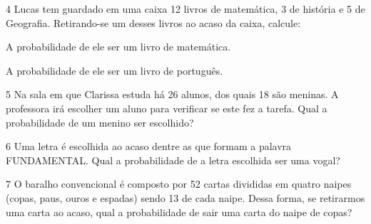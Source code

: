 \num{4} Lucas tem guardado em uma caixa 12 livros de matemática, 3 de
história e 5 de Geografia. Retirando-se um desses livros ao acaso da
caixa, calcule:

\begin{escolha}
\item
  A probabilidade de ele ser um livro de matemática.


\item
  A probabilidade de ele ser um livro de português.

\end{escolha}


\num{5} Na sala em que Clarissa estuda há 26 alunos, dos quais 18 são
meninas. A professora irá escolher um aluno para verificar se este fez a
tarefa. Qual a probabilidade de um menino ser escolhido?



\num{6} Uma letra é escolhida ao acaso dentre as que formam a palavra
FUNDAMENTAL. Qual a probabilidade de a letra escolhida ser uma vogal?



\num{7} O baralho convencional é composto por 52 cartas divididas em quatro
naipes (copas, paus, ouros e espadas) sendo 13 de cada naipe. Dessa
forma, se retirarmos uma carta ao acaso, qual a probabilidade de sair
uma carta do naipe de copas?



